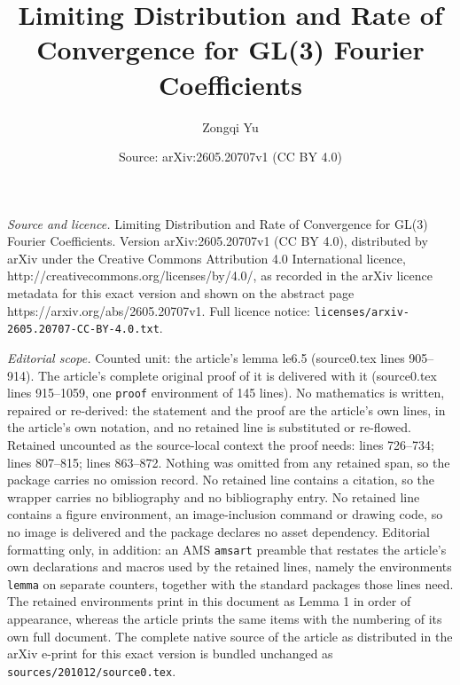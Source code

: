 \documentclass[10pt,a4paper]{amsart}
\title{Limiting Distribution and Rate of Convergence for GL(3) Fourier Coefficients}
\author{Zongqi Yu}
\date{Source: arXiv:2605.20707v1 (CC BY 4.0)}
\begin{document}
\maketitle

\noindent\emph{Source and licence.} Limiting Distribution and Rate of Convergence for GL(3) Fourier Coefficients. Version arXiv:2605.20707v1 (CC BY 4.0), distributed by arXiv under the Creative Commons Attribution 4.0 International licence, http://creativecommons.org/licenses/by/4.0/, as recorded in the arXiv licence metadata for this exact version and shown on the abstract page https://arxiv.org/abs/2605.20707v1. Full licence notice: \texttt{licenses/arxiv-2605.20707-CC-BY-4.0.txt}.\par\smallskip

\noindent\textit{Editorial scope.} Counted unit: the article's lemma le6.5 (source0.tex lines 905--914). The article's complete original proof of it is delivered with it (source0.tex lines 915--1059, one \texttt{proof} environment of 145 lines). No mathematics is written, repaired or re-derived: the statement and the proof are the article's own lines, in the article's own notation, and no retained line is substituted or re-flowed.  Retained uncounted as the source-local context the proof needs: lines 726--734; lines 807--815; lines 863--872.  Nothing was omitted from any retained span, so the package carries no omission record.  No retained line contains a citation, so the wrapper carries no bibliography and no bibliography entry.  No retained line contains a figure environment, an image-inclusion command or drawing code, so no image is delivered and the package declares no asset dependency.  Editorial formatting only, in addition: an AMS \texttt{amsart} preamble that restates the article's own declarations and macros used by the retained lines, namely the environments \texttt{lemma} on separate counters, together with the standard packages those lines need.  The retained environments print in this document as Lemma 1 in order of appearance, whereas the article prints the same items with the numbering of its own full document.  The complete native source of the article as distributed in the arXiv e-print for this exact version is bundled unchanged as \texttt{sources/201012/source0.tex}.
\end{document}
